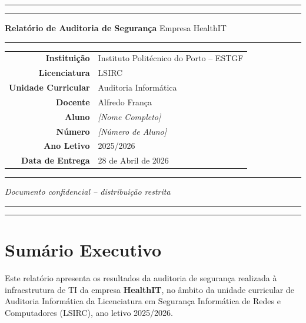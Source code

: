 \documentclass[12pt, a4paper]{report}
\begin{document}

\begin{titlepage}
\centering
\vspace*{2cm}
{\color{NavyBlue}\rule{\linewidth}{2pt}}
\vspace{0.3cm}
{\color{NavyBlue}\rule{\linewidth}{0.4pt}}
\vspace{1.5cm}
{\LARGE\bfseries\color{NavyBlue} Relatório de Auditoria de Segurança}
\vspace{0.4cm}
{\large\color{TextGray} Empresa HealthIT}
\vspace{1.5cm}
{\color{NavyBlue}\rule{0.5\linewidth}{0.4pt}}
\vspace{1.5cm}
\begin{tabular}{rl}
  \textbf{Instituição}       & Instituto Politécnico do Porto -- ESTGF \\[5pt]
  \textbf{Licenciatura}      & LSIRC \\[5pt]
  \textbf{Unidade Curricular}& Auditoria Informática \\[5pt]
  \textbf{Docente}           & Alfredo França \\[5pt]
  \textbf{Aluno}             & \textit{[Nome Completo]} \\[5pt]
  \textbf{Número}            & \textit{[Número de Aluno]} \\[5pt]
  \textbf{Ano Letivo}        & 2025/2026 \\[5pt]
  \textbf{Data de Entrega}   & 28 de Abril de 2026 \\
\end{tabular}
\vfill
{\color{NavyBlue}\rule{0.5\linewidth}{0.4pt}}
\vspace{0.5cm}
{\small\color{TextGray}\textit{Documento confidencial -- distribuição restrita}}
\vspace{0.4cm}
{\color{NavyBlue}\rule{\linewidth}{0.4pt}}
\vspace{0.1cm}
{\color{NavyBlue}\rule{\linewidth}{2pt}}
\end{titlepage}

\tableofcontents
\newpage

\chapter{Sumário Executivo}

Este relatório apresenta os resultados da auditoria de segurança realizada à infraestrutura
de TI da empresa \textbf{HealthIT}, no âmbito da unidade curricular de Auditoria Informática
da Licenciatura em Segurança Informática de Redes e Computadores (LSIRC), ano letivo 2025/2026.
\end{document}

